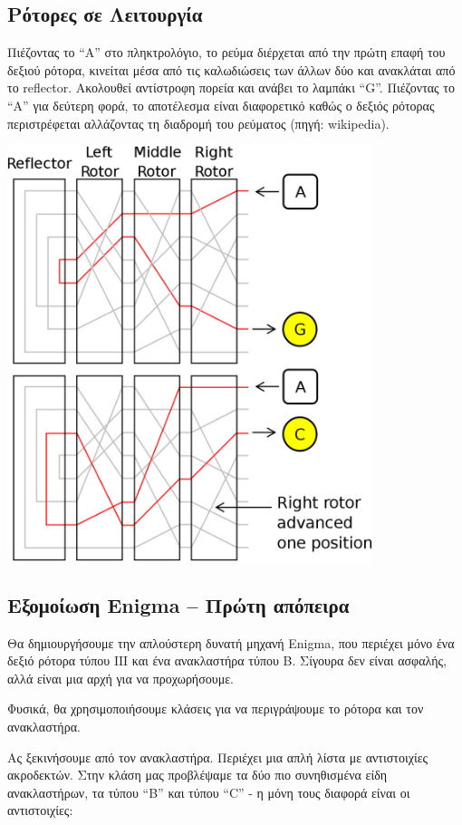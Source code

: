 \documentclass[a4paper,twoside,12pt]{article}
\begin{document}
\subsection{Ρότορες σε Λειτουργία}

Πιέζοντας το “Α” στο πληκτρολόγιο, το ρεύμα διέρχεται από την πρώτη επαφή του δεξιού ρότορα, κινείται μέσα από τις καλωδιώσεις των άλλων δύο και ανακλάται από το reflector. Ακολουθεί αντίστροφη πορεία και ανάβει το λαμπάκι “G”. Πιέζοντας το “Α” για δεύτερη φορά, το αποτέλεσμα είναι διαφορετικό καθώς ο δεξιός ρότορας περιστρέφεται αλλάζοντας τη διαδρομή του ρεύματος (πηγή: wikipedia).
%
\begin{center}
  \includegraphics[width=0.8\textwidth]{images/main/rotor-work}
\end{center}
%

\subsection{Εξομοίωση Enigma  – Πρώτη απόπειρα}

Θα δημιουργήσουμε την απλούστερη δυνατή μηχανή Enigma, που  περιέχει μόνο ένα δεξιό ρότορα τύπου ΙΙΙ και ένα ανακλαστήρα τύπου Β. Σίγουρα δεν είναι ασφαλής, αλλά είναι μια αρχή για να προχωρήσουμε.

Φυσικά, θα χρησιμοποιήσουμε κλάσεις για να περιγράψουμε το ρότορα και τον ανακλαστήρα.

Ας ξεκινήσουμε από τον ανακλαστήρα. Περιέχει μια απλή λίστα με αντιστοιχίες ακροδεκτών. Στην κλάση μας προβλέψαμε τα δύο πιο συνηθισμένα είδη ανακλαστήρων, τα τύπου “Β” και τύπου “C” - η μόνη τους διαφορά είναι οι αντιστοιχίες:
\end{document}
